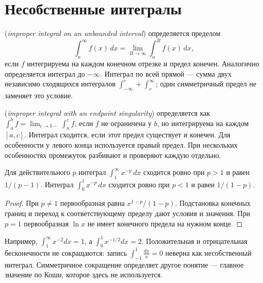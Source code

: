 \section{Несобственные интегралы}
\begin{definition} (\emph{improper integral on an unbounded interval}) определяется пределом
\[
\int_a^\infty f(x)\,dx=\lim_{B\to\infty}\int_a^B f(x)\,dx,
\]
если \(f\) интегрируема на каждом конечном отрезке и предел конечен. Аналогично определяется интеграл до \(-\infty\). Интеграл по всей прямой — сумма двух независимо сходящихся интегралов \(\int_{-\infty}^c+\int_c^\infty\); один симметричный предел не заменяет это условие.\end{definition}
\begin{definition} (\emph{improper integral with an endpoint singularity}) определяется как \(\int_a^b f=\lim_{c\to b-}\int_a^c f\), если \(f\) не ограничена у \(b\), но интегрируема на каждом \([a,c]\). Интеграл сходится, если этот предел существует и конечен. Для особенности у левого конца используется правый предел. При нескольких особенностях промежуток разбивают и проверяют каждую отдельно.\end{definition}
\begin{theorem}
Для действительного \(p\) интеграл \(\int_1^\infty x^{-p}\,dx\) сходится ровно при \(p>1\) и равен \(1/(p-1)\). Интеграл \(\int_0^1x^{-p}\,dx\) сходится ровно при \(p<1\) и равен \(1/(1-p)\).
\end{theorem}
\begin{proof}При \(p\ne1\) первообразная равна \(x^{1-p}/(1-p)\). Подстановка конечных границ и переход к соответствующему пределу дают условия и значения. При \(p=1\) первообразная \(\ln x\) не имеет конечного предела на нужном конце.\end{proof}
Например, \(\int_1^\infty x^{-2}dx=1\), а \(\int_0^1x^{-1/2}dx=2\). Положительная и отрицательная бесконечности не сокращаются: запись \(\int_{-1}^1\frac{dx}{x}=0\) неверна как несобственный интеграл. Симметричное сокращение определяет другое понятие — главное значение по Коши, которое здесь не используется.


